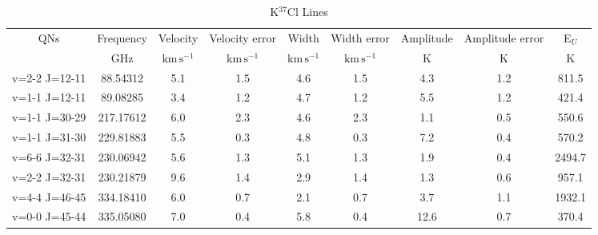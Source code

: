 \begin{table*}[htp]
\centering
\caption{K$^{37}$Cl Lines}
\begin{tabular}{ccccccccc}
\label{tab:K37Cl_salt_lines}
QNs & Frequency & Velocity & Velocity error & Width & Width error & Amplitude & Amplitude error & E$_U$ \\
 & $\mathrm{GHz}$ & $\mathrm{km\,s^{-1}}$ & $\mathrm{km\,s^{-1}}$ & $\mathrm{km\,s^{-1}}$ & $\mathrm{km\,s^{-1}}$ & $\mathrm{K}$ & $\mathrm{K}$ & $\mathrm{K}$ \\
\hline
v=2-2 J=12-11 & 88.54312 & 5.1 & 1.5 & 4.6 & 1.5 & 4.3 & 1.2 & 811.5 \\
v=1-1 J=12-11 & 89.08285 & 3.4 & 1.2 & 4.7 & 1.2 & 5.5 & 1.2 & 421.4 \\
v=1-1 J=30-29 & 217.17612 & 6.0 & 2.3 & 4.6 & 2.3 & 1.1 & 0.5 & 550.6 \\
v=1-1 J=31-30 & 229.81883 & 5.5 & 0.3 & 4.8 & 0.3 & 7.2 & 0.4 & 570.2 \\
v=6-6 J=32-31 & 230.06942 & 5.6 & 1.3 & 5.1 & 1.3 & 1.9 & 0.4 & 2494.7 \\
v=2-2 J=32-31 & 230.21879 & 9.6 & 1.4 & 2.9 & 1.4 & 1.3 & 0.6 & 957.1 \\
v=4-4 J=46-45 & 334.18410 & 6.0 & 0.7 & 2.1 & 0.7 & 3.7 & 1.1 & 1932.1 \\
v=0-0 J=45-44 & 335.05080 & 7.0 & 0.4 & 5.8 & 0.4 & 12.6 & 0.7 & 370.4 \\
\hline
\end{tabular}

\par 
\end{table*}
